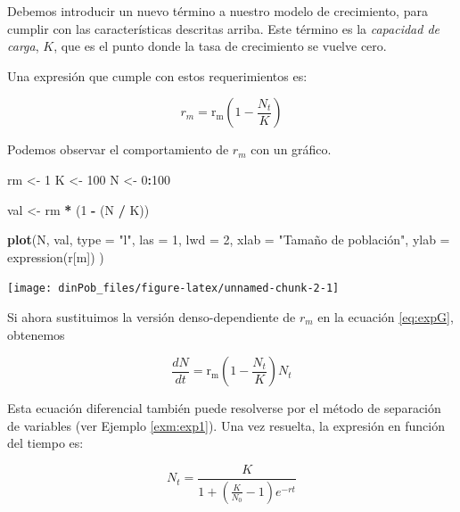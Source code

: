 \documentclass[12pt,letterpaper,]{book}
\newenvironment{Shaded}{\begin{snugshade}}{\end{snugshade}}
\newcommand{\KeywordTok}[1]{\textcolor[rgb]{0.13,0.29,0.53}{\textbf{#1}}}
\newcommand{\DataTypeTok}[1]{\textcolor[rgb]{0.13,0.29,0.53}{#1}}
\newcommand{\DecValTok}[1]{\textcolor[rgb]{0.00,0.00,0.81}{#1}}
\newcommand{\StringTok}[1]{\textcolor[rgb]{0.31,0.60,0.02}{#1}}
\newcommand{\OperatorTok}[1]{\textcolor[rgb]{0.81,0.36,0.00}{\textbf{#1}}}
\newcommand{\NormalTok}[1]{#1}
\begin{document}
Debemos introducir un nuevo término a nuestro modelo de crecimiento,
para cumplir con las características descritas arriba. Este término es
la \emph{capacidad de carga}, \(K\), que es el punto donde la tasa de
crecimiento se vuelve cero.

Una expresión que cumple con estos requerimientos es:

\[
 r_m = \mathrm{r_m}\left(1-\frac{N_t}{K}\right)
\]

Podemos observar el comportamiento de \(r_m\) con un gráfico.

\begin{Shaded}
\begin{Highlighting}[]
\NormalTok{rm <-}\StringTok{ }\DecValTok{1}
\NormalTok{K <-}\StringTok{ }\DecValTok{100}
\NormalTok{N <-}\StringTok{ }\DecValTok{0}\OperatorTok{:}\DecValTok{100}

\NormalTok{val <-}\StringTok{ }\NormalTok{rm }\OperatorTok{*}\StringTok{ }\NormalTok{(}\DecValTok{1} \OperatorTok{-}\StringTok{ }\NormalTok{(N }\OperatorTok{/}\StringTok{ }\NormalTok{K))}

\KeywordTok{plot}\NormalTok{(N,}
\NormalTok{  val,}
  \DataTypeTok{type =} \StringTok{"l"}\NormalTok{, }\DataTypeTok{las =} \DecValTok{1}\NormalTok{, }\DataTypeTok{lwd =} \DecValTok{2}\NormalTok{,}
  \DataTypeTok{xlab =} \StringTok{"Tamaño de población",}
\StringTok{  ylab = expression(r[m])}
\StringTok{  )}
\end{Highlighting}
\end{Shaded}

\begin{center}\texttt{[image: dinPob\_files/figure-latex/unnamed-chunk-2-1]} \end{center}

Si ahora sustituimos la versión denso-dependiente de \(r_m\) en la
ecuación \eqref{eq:expG}, obtenemos

\begin{equation}
\frac{dN}{dt}=\mathrm{r_m}\left(1-\frac{N_t}{K}\right)N_t
 \label{eq:logi1}
\end{equation}

Esta ecuación diferencial también puede resolverse por el método de
separación de variables (ver Ejemplo \ref{exm:exp1}). Una vez resuelta,
la expresión en función del tiempo es:

\begin{equation}
N_t= \frac{K}{1+\left(\frac{K}{N_0}-1\right)e^{-rt}}
 \label{eq:logi2}
\end{equation}
\end{document}
